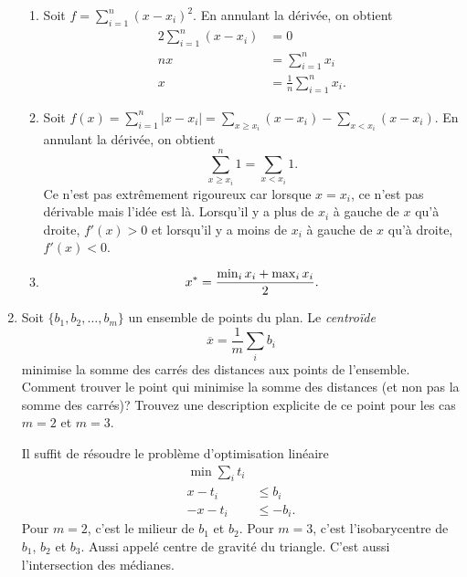\begin{enumerate}
    \begin{solution}
      \begin{enumerate}
        \item
          Soit $f = \sum_{i=1}^{n}(x-x_{i})^{2}$.
          En annulant la dérivée, on obtient
          \begin{align*}
            2\sum_{i=1}^{n}(x-x_{i}) & = 0\\
            nx & = \sum_{i=1}^{n} x_{i}\\
            x & = \frac{1}{n}\sum_{i=1}^{n} x_{i}.
          \end{align*}
        \item
          Soit $f(x) = \sum_{i=1}^{n} |x-x_{i}| = \sum_{x \geq x_{i}}
          (x-x_{i}) - \sum_{x < x_{i}} (x-x_{i})$.
          En annulant la dérivée, on obtient
          \[ \sum_{x \geq x_i}^n 1 = \sum_{x < x_i} 1. \]
          Ce n'est pas extrêmement rigoureux car lorsque
          $x = x_i$, ce n'est pas dérivable mais l'idée est là.
          Lorsqu'il y a plus de $x_i$ à gauche de $x$ qu'à droite,
          $f'(x) > 0$ et
          lorsqu'il y a moins de $x_i$ à gauche de $x$ qu'à droite,
          $f'(x) < 0$.
        \item
          \[ x^* = \frac{\min_i x_i + \max_i x_i}{2}. \]
      \end{enumerate}
    \end{solution}



  \item  Soit $\{b_1, b_2, \ldots, b_m\}$ un ensemble de points du plan. Le \emph{centro\"ide}
    $$\overline x = \frac{1}{m} \sum_i b_i$$
    minimise la somme des carrés des distances aux points de l'ensemble. Comment trouver le point qui minimise la somme des distances (et
    non pas la somme des carrés)? Trouvez une description explicite de ce point pour les cas $m=2$ et $m=3$.

    \begin{solution}
      Il suffit de résoudre le problème d'optimisation linéaire
      \begin{align*}
        \min \sum_i t_i\\
        x - t_i & \leq b_i\\
        -x - t_i & \leq -b_i.
      \end{align*}
      Pour $m = 2$, c'est le milieur de $b_1$ et $b_2$.
      Pour $m = 3$, c'est l'isobarycentre de $b_1$, $b_2$ et $b_3$.
      Aussi appelé centre de gravité du triangle.
      C'est aussi l'intersection des médianes.
    \end{solution}





\end{enumerate}
